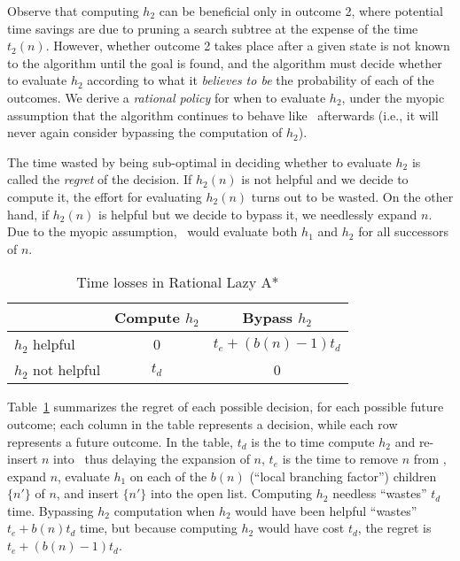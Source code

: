 Observe that computing $h_2$ can be beneficial only in outcome 2, where
potential time savings are due to pruning a search subtree at the expense of
the time $t_2(n)$. However, whether outcome 2 takes place after a given state
is not known to the algorithm until the goal is found, and the algorithm must
decide whether to evaluate $h_2$ according to what it \textit{believes to be}
the probability of each of the outcomes. We derive a \textit{rational policy}
for when to evaluate $h_2$, under the myopic assumption that the algorithm
continues to behave like \lazyastar~afterwards (i.e., it will never again
consider bypassing the computation of $h_2$).

The time wasted by being sub-optimal in deciding whether to evaluate $h_2$ is
called the {\em regret} of the decision. If $h_2(n)$ is not helpful and we decide to compute it, the effort for evaluating $h_2(n)$ turns out to be wasted. On the other hand, if $h_2(n)$ is helpful but we decide to bypass it, we needlessly expand $n$. Due to the myopic assumption, \rationallazyastar~would evaluate both $h_1$ and $h_2$ for all successors of
$n$.

\begin{table}[t]
\begin{small}
\begin{center}
\begin{tabular}{|l|c|c|}
\hline
               & Compute $h_2$ & Bypass $h_2$\\
\hline
$h_2$ helpful &   0            & $t_e+(b(n)-1)t_d$\\
\hline
$h_2$ not helpful & $t_d$      & 0 \\
\hline
\end{tabular}
\end{center}
\end{small}\vspace{-0.2cm}
\caption{Time losses in Rational Lazy A*}
\label{tbl:rational-lazy-a-time}
\end{table}

Table~\ref{tbl:rational-lazy-a-time}
summarizes the regret of each possible decision, for each possible future
outcome; each column in the table represents a decision, while each row
represents a future outcome.
In the table, $t_d$ is the to time compute $h_2$ and re-insert $n$ into
\OPEN~thus delaying the expansion of $n$, $t_e$ is the time to remove $n$ from \OPEN,
expand $n$, evaluate $h_1$ on each of the $b(n)$ (``local branching factor'')
children $\{n'\}$ of $n$, and insert $\{n'\}$ into the open list.
Computing $h_2$ needless ``wastes'' $t_d$ time.
Bypassing $h_2$ computation when $h_2$ would have been helpful ``wastes''
$t_e+b(n)t_d$ time, but because computing $h_2$ would have cost $t_d$, the
regret is $t_e+(b(n)-1)t_d$.

